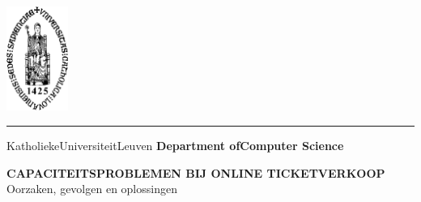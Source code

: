 \documentclass[a4paper,10pt]{article}
\begin{document}

\begin{titlepage}
    \newpage
    \thispagestyle{empty}
    \frenchspacing
    \hspace{-0.2cm}
    \includegraphics[height=3.4cm]{img/kul-logo.png}
    \hspace{0.2cm}
    \rule{0.5pt}{3.4cm}
    \hspace{0.2cm}
    \begin{minipage}[b]{8cm}
        \Large{Katholieke\newline Universiteit\newline Leuven}\smallskip\newline
        \large{}\smallskip\newline
        \textbf{Department of\newline Computer Science}\smallskip
    \end{minipage}
    \vspace*{3.2cm}\vfill
    \begin{center}
        \begin{minipage}[t]{\textwidth}
            \begin{center}
                \LARGE{\rm{\textbf{\uppercase{Capaciteitsproblemen bij online ticketverkoop}}}}\\
                \Large{\rm{Oorzaken, gevolgen en oplossingen}}
            \end{center}
        \end{minipage}
    \end{center}
    \vfill
    \hfill{}
\end{titlepage}
\end{document}
